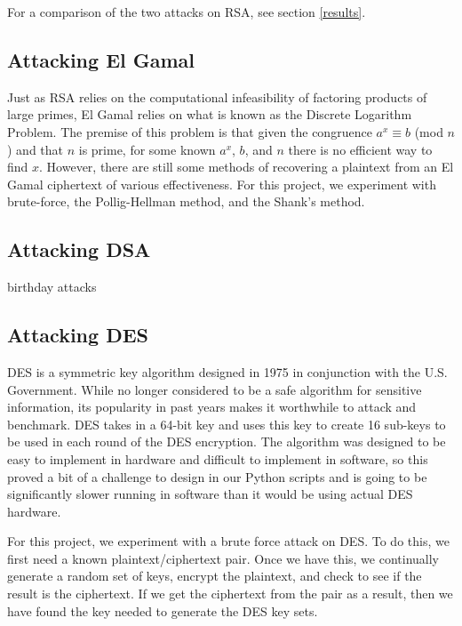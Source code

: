 \documentclass[12pt]{report}
\begin{document}
For a comparison of the two attacks on RSA, see section \ref{results}.

\subsection{Attacking El Gamal}
Just as RSA relies on the computational infeasibility of factoring products of large primes, El Gamal relies on what is known as the Discrete Logarithm Problem. The premise of this problem is that
given the congruence $a^{x} \equiv b$ (mod $n$) and that $n$ is prime, for some known $a^{x}$, $b$, and $n$ there is no efficient way to find $x$. However, there are still some methods of
recovering a plaintext from an El Gamal ciphertext of various effectiveness. For this project, we experiment with brute-force, the Pollig-Hellman method, and the Shank's method.


\subsection{Attacking DSA}
birthday attacks

\subsection{Attacking DES}
DES is a symmetric key algorithm designed in 1975 in conjunction with the U.S. Government. While no longer considered to be a safe algorithm for sensitive information, its popularity in past years
makes it worthwhile to attack and benchmark. DES takes in a 64-bit key and uses this key to create 16 sub-keys to be used in each round of the DES encryption. The algorithm was designed to be easy
 to implement in hardware and difficult to implement in software, so this proved a bit of a challenge to design in our Python scripts and is going to be significantly slower running in software
 than it would be using actual DES hardware.

For this project, we experiment with a brute force attack on DES. To do this, we first need a known plaintext/ciphertext pair. Once we have this, we continually generate a random set of keys,
encrypt the plaintext, and check to see if the result is the ciphertext. If we get the ciphertext from the pair as a result, then we have found the key needed to generate the DES key sets.
\end{document}
